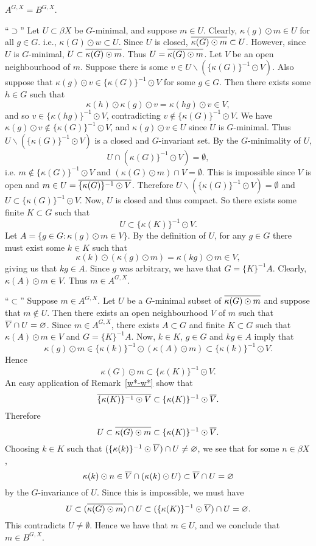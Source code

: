 \begin{theorem}\label{fairchild3.1}
$A^{G,X} = B^{G,X}$.
\end{theorem}
\proof
``$\supset$''  Let $U\subset \beta X$ be $G$-minimal, and suppose $m\in U$.
Clearly, $\kappa(g) \odot m \in U$ for all $g\in G$.  i.e., $\kappa(G) \odot w \subset U$.
Since $U$ is closed, $\overline{ \kappa(G) \odot m} \subset U$.
However, since $U$ is $G$-minimal, $U \subset \overline{ \kappa(G) \odot m}$.  Thus 
$U = \overline{\kappa(G) \odot m}$.  Let $V$ be an open neighbourhood of $m$.  Suppose there is some
$v\in U\backslash (\{\kappa(G)\}^{-1} \odot V)$.  Also suppose that $\kappa(g) \odot v \in \{\kappa(G)\}^{-1} \odot V$
for some $g\in G$.  Then there exists some $h\in G$ such that
\[
\kappa(h) \odot \kappa(g) \odot v = \kappa(hg) \odot v \in V,
\]
and so $v\in \{\kappa(hg)\}^{-1} \odot V$,
contradicting $v\not\in \{\kappa(G)\}^{-1} \odot V$.  We have $\kappa(g) \odot v \not\in \{\kappa(G)\}^{-1} \odot V$,
and $\kappa(g) \odot v \in U$ since $U$ is $G$-minimal.  Thus $U\backslash (\{\kappa(G)\}^{-1} \odot V)$
is a closed and $G$-invariant set.  By the $G$-minimality of $U$,
\[
U\cap (\kappa(G)\}^{-1} \odot V) = \emptyset,
\]
i.e. $m\not\in \{\kappa(G)\}^{-1} \odot V$ and
$(\kappa(G) \odot m) \cap V = \emptyset$.  This is impossible since $V$ is open and
$m\in U = \overline{\{\kappa(G)\}^{-1} \odot V}$.  Therefore $U\backslash (\{\kappa(G)\}^{-1} \odot V) = \emptyset$
and $U\subset \{\kappa(G)\}^{-1} \odot V$.  Now, $U$ is closed and thus compact.  So there exists some finite
$K\subset G$ such that
\[
U\subset \{\kappa(K)\}^{-1} \odot V.
\]
Let $A = \{g\in G: \kappa(g) \odot m \in V \}$.
By the definition of $U$, for any $g\in G$ there must exist some $k\in K$ such that
\[
\kappa(k) \odot (\kappa(g) \odot m) = \kappa(kg) \odot m \in V,
\]
giving us that $kg\in A$.  Since $g$
was arbitrary, we have that $G =\{K\}^{-1}A$.  Clearly, $\kappa(A) \odot m \in V$.  Thus $m\in A^{G,X}$.

``$\subset$''  Suppose $m\in A^{G,X}$.  Let $U$ be a $G$-minimal subset of $\overline{\kappa(G) \odot m}$ and
suppose that $m\not\in U$.  Then there exists an open neighbourhood $V$ of $m$ such that
$\overline{V}\cap U = \varnothing$.  Since $m\in A^{G,X}$, there exists $A\subset G$ and finite $K\subset G$
such that $\kappa(A) \odot m \in V$ and $G = \{K\}^{-1}A$.  Now, $k\in K$, $g\in G$ and $kg\in A$
imply that
\[
\kappa(g) \odot m \in \{\kappa(k)\}^{-1} \odot (\kappa(A) \odot m) \subset \{\kappa(k)\}^{-1} \odot V.
\]
Hence
\[
\kappa(G) \odot m \subset \{\kappa(K)\}^{-1} \odot V.
\]
An easy application of Remark~\ref{w*-w*} show that
\[
\overline{\{\kappa(K)\}^{-1} \odot V} \subset \{\kappa(K)\}^{-1} \odot \overline{V}.
\]
Therefore
\[
U\subset\overline{\kappa(G) \odot m} \subset \{\kappa(K)\}^{-1} \odot \overline{V}.
\]
Choosing $k\in K$ such that $(\{\kappa(k)\}^{-1} \odot \overline{V}) \cap U \neq \varnothing$, we see
that for some $n\in\beta X$,
\[
\kappa(k) \odot n \in \overline{V} \cap (\kappa(k) \odot U) \subset \overline{V} \cap U = \varnothing
\]
by the $G$-invariance of $U$.  Since this is impossible, we must have
\[
U \subset (\overline{\kappa(G) \odot m}) \cap U \subset (\{\kappa(K)\}^{-1} \odot \overline{V}) \cap U = \varnothing.
\]
This contradicts $U\neq\emptyset$.  Hence we have that $m\in U$, and we conclude that $m\in B^{G,X}$.
\done

